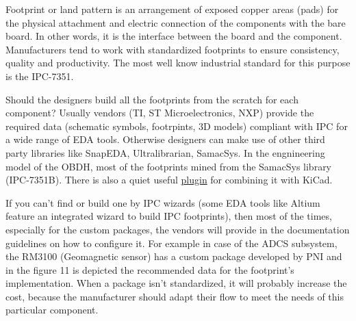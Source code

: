 \documentclass[final]{cubedoc}
\begin{document}
	
	
	
	Footprint or land pattern is an arrangement of exposed copper areas (pads) for the physical attachment and electric connection of the components with the bare board. In other words, it is the interface between the board and the component. Manufacturers tend to work with standardized footprints to ensure consistency, quality and productivity. The most well know industrial standard for this purpose is the IPC-7351. 
	
	Should the designers build all the footprints from the scratch for each component? Usually vendors (TI, ST Microelectronics, NXP) provide the required data (schematic symbols, footrpints, 3D models) compliant with IPC for a wide range of EDA tools. Otherwise designers can make use of other third party libraries like SnapEDA, Ultralibrarian, SamacSys. In the engnineering model of the OBDH, most of the footprints mined from the SamacSys library (IPC-7351B). There is also a quiet useful \href{https://www.samacsys.com/kicad-libraries/}{plugin} for combining it with KiCad.
	
	If you can't find or build one by IPC wizards (some EDA tools like Altium feature an integrated wizard to build IPC footprints), then most of the times, especially for the custom packages, the vendors will provide in the documentation guidelines on how to configure it. For example in case of the ADCS subsystem, the RM3100 (Geomagnetic sensor) has a custom package developed by PNI and in the figure 11 is depicted the recommended data for the footprint's implementation. When a package isn't standardized, it will probably increase the cost, because the manufacturer should adapt their flow to meet the needs of this particular component. %
	
\end{document}
